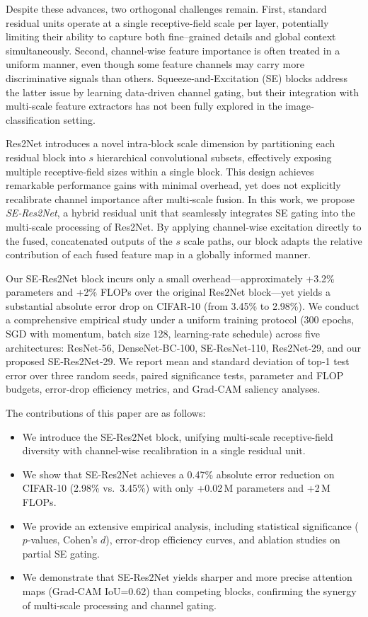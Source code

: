 \documentclass{article}
\begin{document}
Despite these advances, two orthogonal challenges remain. First, standard residual units operate at a single receptive‐field scale per layer, potentially limiting their ability to capture both fine–grained details and global context simultaneously. Second, channel‐wise feature importance is often treated in a uniform manner, even though some feature channels may carry more discriminative signals than others. Squeeze‐and‐Excitation (SE) blocks address the latter issue by learning data‐driven channel gating, but their integration with multi‐scale feature extractors has not been fully explored in the image‐classification setting.

Res2Net introduces a novel intra‐block scale dimension by partitioning each residual block into $s$ hierarchical convolutional subsets, effectively exposing multiple receptive‐field sizes within a single block. This design achieves remarkable performance gains with minimal overhead, yet does not explicitly recalibrate channel importance after multi‐scale fusion. In this work, we propose \emph{SE‐Res2Net}, a hybrid residual unit that seamlessly integrates SE gating into the multi‐scale processing of Res2Net. By applying channel‐wise excitation directly to the fused, concatenated outputs of the $s$ scale paths, our block adapts the relative contribution of each fused feature map in a globally informed manner.

Our SE‐Res2Net block incurs only a small overhead—approximately +3.2\% parameters and +2\% FLOPs over the original Res2Net block—yet yields a substantial absolute error drop on CIFAR‐10 (from 3.45\% to 2.98\%). We conduct a comprehensive empirical study under a uniform training protocol (300 epochs, SGD with momentum, batch size 128, learning‐rate schedule) across five architectures: ResNet‐56, DenseNet‐BC‐100, SE‐ResNet‐110, Res2Net‐29, and our proposed SE‐Res2Net‐29. We report mean and standard deviation of top‐1 test error over three random seeds, paired significance tests, parameter and FLOP budgets, error‐drop efficiency metrics, and Grad‐CAM saliency analyses.

The contributions of this paper are as follows:
\begin{itemize}
  \item We introduce the SE‐Res2Net block, unifying multi‐scale receptive‐field diversity with channel‐wise recalibration in a single residual unit.
  \item We show that SE‐Res2Net achieves a 0.47\% absolute error reduction on CIFAR‐10 (2.98\% vs.\ 3.45\%) with only +0.02\,M parameters and +2\,M FLOPs.
  \item We provide an extensive empirical analysis, including statistical significance ($p$‐values, Cohen’s $d$), error‐drop efficiency curves, and ablation studies on partial SE gating.
  \item We demonstrate that SE‐Res2Net yields sharper and more precise attention maps (Grad‐CAM IoU=0.62) than competing blocks, confirming the synergy of multi‐scale processing and channel gating.
\end{itemize}
\end{document}
